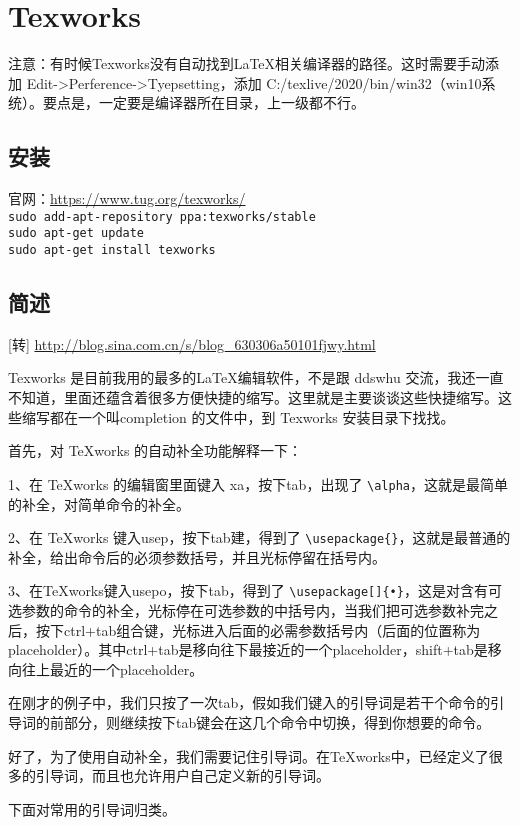 \section{Texworks}
注意：有时候Texworks没有自动找到\LaTeX{}相关编译器的路径。这时需要手动添加
Edit->Perference->Tyepsetting，添加
C:/texlive/2020/bin/win32（win10系统）。要点是，一定要是编译器所在目录，上一级都不行。


\subsection{安装}
官网：\url{https://www.tug.org/texworks/}\\
\verb|sudo add-apt-repository ppa:texworks/stable|\\
\verb|sudo apt-get update|\\
\verb|sudo apt-get install texworks|


\subsection{简述}
[转] \url{http://blog.sina.com.cn/s/blog_630306a50101fjwy.html}

Texworks 是目前我用的最多的\LaTeX 编辑软件，不是跟 ddswhu 交流，我还一直不知道，里面还蕴含着很多方便快捷的缩写。这里就是主要谈谈这些快捷缩写。这些缩写都在一个叫completion 的文件中，到 Texworks 安装目录下找找。

首先，对 TeXworks 的自动补全功能解释一下：

1、在 TeXworks 的编辑窗里面键入 xa，按下tab，出现了 \verb|\alpha|，这就是最简单的补全，对简单命令的补全。

2、在 TeXworks 键入usep，按下tab建，得到了 \verb|\usepackage{}|，这就是最普通的补全，给出命令后的必须参数括号，并且光标停留在括号内。

3、在TeXworks键入usepo，按下tab，得到了 \verb|\usepackage[]{•}|，这是对含有可选参数的命令的补全，光标停在可选参数的中括号内，当我们把可选参数补完之后，按下ctrl+tab组合键，光标进入后面的必需参数括号内（后面的位置称为placeholder）。其中ctrl+tab是移向往下最接近的一个placeholder，shift+tab是移向往上最近的一个placeholder。
 
在刚才的例子中，我们只按了一次tab，假如我们键入的引导词是若干个命令的引导词的前部分，则继续按下tab键会在这几个命令中切换，得到你想要的命令。
 
好了，为了使用自动补全，我们需要记住引导词。在TeXworks中，已经定义了很多的引导词，而且也允许用户自己定义新的引导词。
 
下面对常用的引导词归类。
 
